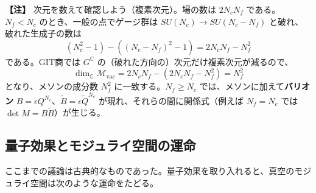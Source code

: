 \documentclass[uplatex, dvipdfmx, book]{jsbook}
\let\origsubsection\subsection
\let\origsubsubsection\subsubsection
\renewcommand{\section}{\origsubsection}
\renewcommand{\subsection}{\origsubsubsection}
\renewcommand{\subsubsection}{\paragraph}
\newenvironment{note}{\vspace{1ex}\par\footnotesize\noindent\textbf{【注】}}{\par\vspace{1ex}}
\begin{document}
\begin{note}
次元を数えて確認しよう（複素次元）。場の数は $2N_cN_f$ である。$N_f < N_c$ のとき、一般の点でゲージ群は $SU(N_c) \to SU(N_c - N_f)$ と破れ、破れた生成子の数は
\begin{equation*}
    (N_c^2 - 1) - \left( (N_c - N_f)^2 - 1 \right) = 2N_cN_f - N_f^2
\end{equation*}
である。GIT商では $G^\mathbb{C}$ の（破れた方向の）次元だけ複素次元が減るので、
\begin{equation*}
    \dim_{\mathbb{C}} \mathcal{M}_{\text{vac}} = 2N_cN_f - (2N_cN_f - N_f^2) = N_f^2
\end{equation*}
となり、メソンの成分数 $N_f^2$ に一致する。$N_f \ge N_c$ では、メソンに加えて\textbf{バリオン} $B = \epsilon Q^{N_c}$、$\tilde{B} = \epsilon \tilde{Q}^{N_c}$ が現れ、それらの間に関係式（例えば $N_f = N_c$ では $\det M = B\tilde{B}$）が生じる。
\end{note}

\section{量子効果とモジュライ空間の運命}

ここまでの議論は古典的なものであった。量子効果を取り入れると、真空のモジュライ空間は次のような運命をたどる。
\end{document}
